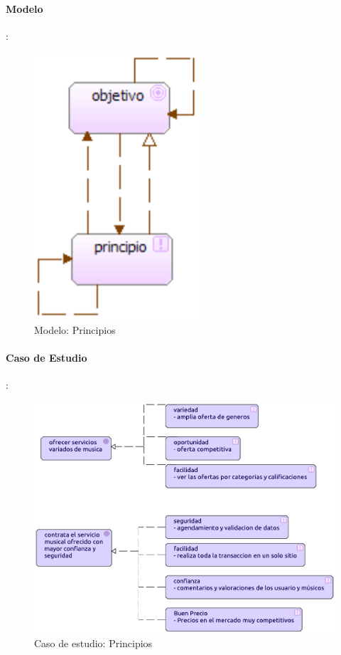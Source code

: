 \paragraph{Modelo}:
\begin{figure}[h!]
	\centering
	\includegraphics[width=0.4\linewidth]{Desarrollo/ArquitecturaEmpresarial/Motivacion/imgs/PrincipiosMetamodelo.PNG}
	\caption{Modelo: Principios}
\end{figure}
\newpage
\paragraph{Caso de Estudio}:
\begin{figure}[h!]
	\centering
	\includegraphics[width=\linewidth]{Desarrollo/ArquitecturaEmpresarial/Motivacion/imgs/Principios.pdf}
	\caption{Caso de estudio: Principios}
\end{figure}


